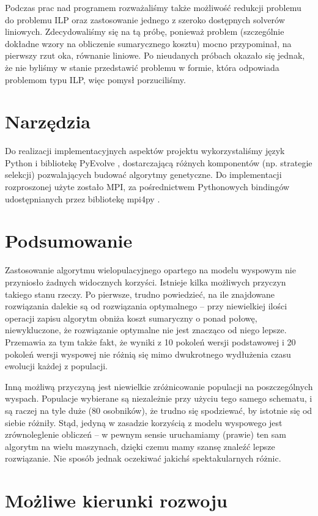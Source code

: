 \documentclass[11pt,pdftex,a4paper]{scrartcl}
\begin{document}
Podczas prac nad programem rozważaliśmy także możliwość redukcji problemu do problemu ILP oraz zastosowanie jednego z szeroko dostępnych solverów liniowych. Zdecydowaliśmy się na tą próbę, ponieważ problem (szczególnie dokładne wzory na obliczenie sumarycznego kosztu) mocno przypominał, na pierwszy rzut oka, równanie liniowe. Po nieudanych próbach okazało się jednak, że nie byliśmy w stanie przedstawić problemu w formie, która odpowiada problemom typu ILP, więc pomysł porzuciliśmy.

\section{Narzędzia}
Do realizacji implementacyjnych aspektów projektu wykorzystaliśmy język Python i bibliotekę
PyEvolve \cite{pyevolve}, dostarczającą różnych komponentów (np. strategie selekcji) pozwalających
budować algorytmy genetyczne. Do implementacji rozproszonej użyte zostało MPI, za pośrednictwem
Pythonowych bindingów udostępnianych przez bibliotekę mpi4py \cite{mpi4py}.

\section{Podsumowanie}

Zastosowanie algorytmu wielopulacyjnego opartego na modelu wyspowym nie przyniosło żadnych widocznych
korzyści. Istnieje kilka możliwych przyczyn takiego stanu rzeczy. Po pierwsze, trudno powiedzieć, na
ile znajdowane rozwiązania dalekie są od rozwiązania optymalnego -- przy niewielkiej ilości operacji
zapisu algorytm obniża koszt sumaryczny o ponad połowę, niewykluczone, że rozwiązanie optymalne nie
jest znacząco od niego lepsze. Przemawia za tym także fakt, że wyniki z 10 pokoleń wersji podstawowej
i 20 pokoleń wersji wyspowej nie różnią się mimo dwukrotnego wydłużenia czasu ewolucji każdej z
populacji.

Inną możliwą przyczyną jest niewielkie zróżnicowanie populacji na poszczególnych wyspach. Populacje
wybierane są niezależnie przy użyciu tego samego schematu, i są raczej na tyle duże (80 osobników),
że trudno się spodziewać, by istotnie się od siebie różniły. Stąd, jedyną w zasadzie korzyścią z modelu
wyspowego jest zrównoleglenie obliczeń -- w pewnym sensie uruchamiamy (prawie) ten sam algorytm
na wielu maszynach, dzięki czemu mamy szansę znaleźć lepsze rozwiązanie. Nie sposób jednak oczekiwać
jakichś spektakularnych różnic.


\section{Możliwe kierunki rozwoju}
\end{document}
